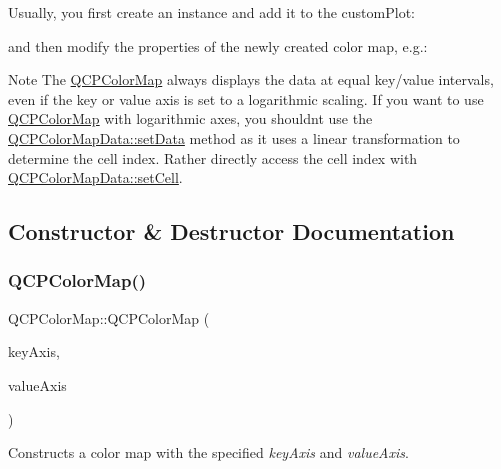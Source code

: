Usually, you first create an instance and add it to the custom\+Plot\+: 
\begin{DoxyCodeInclude}
\end{DoxyCodeInclude}
and then modify the properties of the newly created color map, e.\+g.\+: 
\begin{DoxyCodeInclude}
\end{DoxyCodeInclude}
 \begin{DoxyNote}{Note}
The \hyperlink{class_q_c_p_color_map}{Q\+C\+P\+Color\+Map} always displays the data at equal key/value intervals, even if the key or value axis is set to a logarithmic scaling. If you want to use \hyperlink{class_q_c_p_color_map}{Q\+C\+P\+Color\+Map} with logarithmic axes, you shouldn\textquotesingle{}t use the \hyperlink{class_q_c_p_color_map_data_afd2083ccfd6987ec94aa7ef8e91ca39a}{Q\+C\+P\+Color\+Map\+Data\+::set\+Data} method as it uses a linear transformation to determine the cell index. Rather directly access the cell index with \hyperlink{class_q_c_p_color_map_data_a8e75eaf8746596319032a93f3d2d0683}{Q\+C\+P\+Color\+Map\+Data\+::set\+Cell}. 
\end{DoxyNote}


\subsection{Constructor \& Destructor Documentation}
\hypertarget{class_q_c_p_color_map_aa37e976d2ee1e2be6c4cd88a64b36215}{}\label{class_q_c_p_color_map_aa37e976d2ee1e2be6c4cd88a64b36215} 
\subsubsection{\texorpdfstring{Q\+C\+P\+Color\+Map()}{QCPColorMap()}}
{\footnotesize\ttfamily Q\+C\+P\+Color\+Map\+::\+Q\+C\+P\+Color\+Map (\begin{DoxyParamCaption}\item[{\hyperlink{class_q_c_p_axis}{Q\+C\+P\+Axis} $\ast$}]{key\+Axis,  }\item[{\hyperlink{class_q_c_p_axis}{Q\+C\+P\+Axis} $\ast$}]{value\+Axis }\end{DoxyParamCaption})\hspace{0.3cm}{\ttfamily [explicit]}}

Constructs a color map with the specified {\itshape key\+Axis} and {\itshape value\+Axis}.

